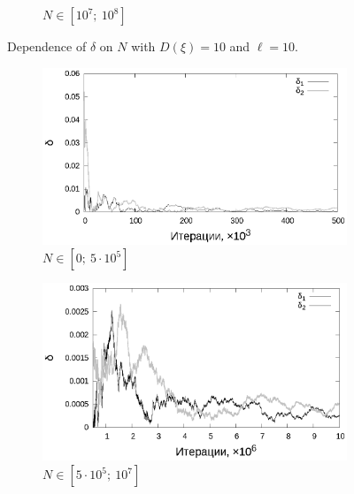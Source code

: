 \documentclass[11pt,a4paper]{article}
\theoremstyle{definition}
\begin{document}
\begin{figure}[h!]
\begin{subfigure}[b]{0.3\textwidth}
    \caption{$N \in [10^7;~10^8]$}
    \label{fig:classic_var10_n10_end}
  \end{subfigure}
  \caption{Dependence of $\delta$ on $N$ with $D(\xi) = 10$ and $\ell = 10$.}
  \label{fig:classic_var10_n10}
\end{figure}

\begin{figure}[h!]
  \begin{subfigure}[b]{0.3\textwidth}
    \includegraphics[width=\textwidth]{figs/classic/linear_log_1x_2_samples_10_variance_1_norm.log_0_500.eps}
    \caption{$N \in [0;~5 \cdot 10^5]$}
    \label{fig:classic_var1_n10_begin}
  \end{subfigure}
  \begin{subfigure}[b]{0.3\textwidth}
    \includegraphics[width=\textwidth]{figs/classic/linear_log_1x_2_samples_10_variance_1_norm.log_500_10000.eps}
    \caption{$N \in [5 \cdot 10^5;~10^7]$}
    \label{fig:classic_var1_n10_middle}
  \end{subfigure}
  \begin{subfigure}[b]{0.3\textwidth}

\end{subfigure}
\end{figure}
\end{document}
